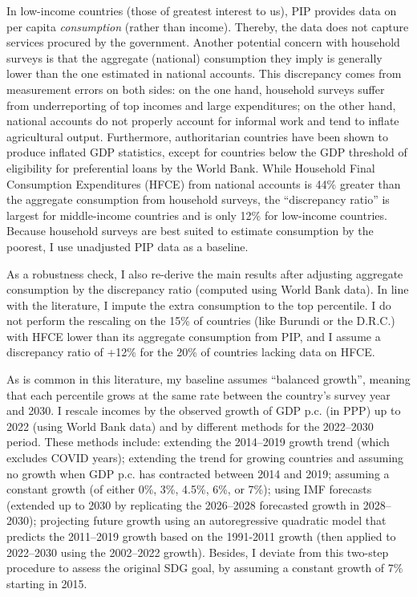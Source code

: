 In low-income countries (those of greatest interest to us), PIP provides data on per capita \textit{consumption} (rather than income). Thereby, the data does not capture services procured by the government. Another potential concern with household surveys is that the aggregate (national) consumption they imply is generally lower than the one estimated in national accounts.\cite{deaton_measuring_2005,prydz_disparities_2022} This discrepancy comes from measurement errors on both sides: on the one hand, household surveys suffer from underreporting of top incomes and large expenditures; on the other hand, national accounts do not properly account for informal work %
and tend to inflate agricultural output.\cite{angrist_why_2021} 
Furthermore, authoritarian countries have been shown to produce inflated GDP statistics, except for countries below the GDP threshold of eligibility for preferential loans by the World Bank.\cite{martinez_how_2022} %
While Household Final Consumption Expenditures (HFCE) from national accounts is 44\% greater than the aggregate consumption from household surveys, the ``discrepancy ratio'' is largest for middle-income countries and is only 12\% for low-income countries. 
Because household surveys are best suited to estimate consumption by the poorest, I use unadjusted PIP data as a baseline. 

As a robustness check, I also re-derive the main results %
after adjusting aggregate consumption by the discrepancy ratio (computed using World Bank data). In line with the literature,\cite{lakner_global_2013,anand_chapter_2015} I impute the extra consumption to the top percentile. I do not perform the rescaling on the 15\% of countries (like Burundi or the D.R.C.) with HFCE lower than its aggregate consumption from PIP, and I assume a discrepancy ratio of +12\% for the 20\% of countries lacking data on HFCE. 

As is common in this literature,\cite{karver_mdgs_2012,hellebrandt_future_2015,bicaba_can_2017} my baseline assumes ``balanced growth'', meaning that each percentile grows at the same rate between the country's survey year and 2030. 
I rescale incomes by the observed growth of GDP p.c. (in PPP) up to 2022 (using World Bank data) and by different methods for the 2022--2030 period. 
These methods include: extending the 2014--2019 growth trend (which excludes COVID years); extending the trend for growing countries and assuming no growth when GDP p.c. has contracted between 2014 and 2019; assuming a constant growth (of either 0\%, 3\%, 4.5\%, 6\%, or 7\%); using IMF forecasts\cite{imf_world_2023} (extended up to 2030 by replicating the 2026--2028 forecasted growth in 2028--2030); projecting future growth using an autoregressive quadratic model that predicts the 2011--2019 growth based on the 1991-2011 growth (then applied to 2022--2030 using the 2002--2022 growth). Besides, I deviate from this two-step procedure to assess the original SDG goal, by assuming a constant growth of 7\% starting in 2015.

